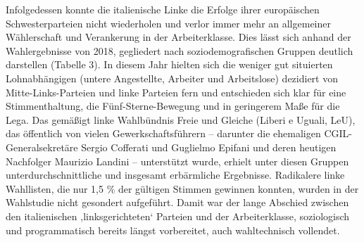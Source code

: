 \begin{multicols*}{2}
Infolgedessen konnte die italienische Linke die Erfolge ihrer europäischen Schwesterparteien nicht wiederholen und verlor immer mehr an allgemeiner Wählerschaft und Verankerung in der Arbeiterklasse. Dies lässt sich anhand der Wahlergebnisse von 2018, gegliedert nach soziodemografischen Gruppen deutlich darstellen (Tabelle 3). In diesem Jahr hielten sich die weniger gut situierten Lohnabhängigen (untere Angestellte, Arbeiter und Arbeitslose) dezidiert von Mitte-Links-Parteien und linke Parteien fern und entschieden sich klar für eine Stimmenthaltung, die Fünf-Sterne-Bewegung und in geringerem Maße für die Lega. Das gemäßigt linke Wahlbündnis Freie und Gleiche (Liberi e Uguali, LeU), das öffentlich von vielen Gewerkschaftsführern – darunter die ehemaligen CGIL-Generalsekretäre Sergio Cofferati und Guglielmo Epifani und deren heutigen Nachfolger Maurizio Landini – unterstützt wurde, erhielt unter diesen Gruppen unterdurchschnittliche und insgesamt erbärmliche Ergebnisse. Radikalere linke Wahllisten, die nur 1,5 \% der gültigen Stimmen gewinnen konnten, wurden in der Wahlstudie nicht gesondert aufgeführt. Damit war der lange Abschied zwischen den italienischen ‚linksgerichteten‘ Parteien und der Arbeiterklasse, soziologisch und programmatisch bereits längst vorbereitet, auch wahltechnisch vollendet.\par


\end{multicols*}
